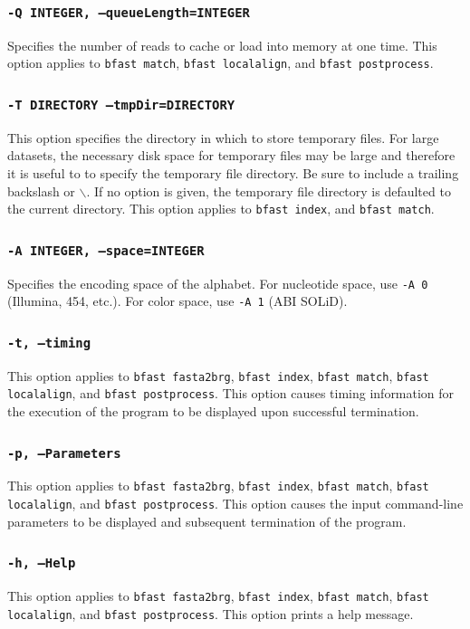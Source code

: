 \documentclass[a4paper,12pt]{book}
\newcommand{\TT}[1]{{\tt #1}} %
\begin{document}
\subsubsection{\TT{-Q INTEGER, --queueLength=INTEGER}}
Specifies the number of reads to cache or load into memory at one time.
This option applies to \TT{bfast match}, \TT{bfast localalign}, and \TT{bfast postprocess}.

\subsubsection{\TT{-T DIRECTORY --tmpDir=DIRECTORY}}
This option specifies the directory in which to store temporary files.
For large datasets, the necessary disk space for temporary files may be large and therefore it is useful to to specify the temporary file directory. 
Be sure to include a trailing backslash or $\backslash$.
If no option is given, the temporary file directory is defaulted to the current directory.
This option applies to \TT{bfast index}, and \TT{bfast match}.

\subsubsection{\TT{-A INTEGER, --space=INTEGER}}
Specifies the encoding space of the alphabet.
For nucleotide space, use \TT{-A 0} (Illumina, 454, etc.).
For color space, use \TT{-A 1} (ABI SOLiD).


\subsubsection{\TT{-t, --timing}}
This option applies to \TT{bfast fasta2brg}, \TT{bfast index}, \TT{bfast match}, \TT{bfast localalign}, and \TT{bfast postprocess}.
This option causes timing information for the execution of the program to be displayed upon successful termination.

\subsubsection{\TT{-p, --Parameters}}
This option applies to \TT{bfast fasta2brg}, \TT{bfast index}, \TT{bfast match}, \TT{bfast localalign}, and \TT{bfast postprocess}.
This option causes the input command-line parameters to be displayed and subsequent termination of the program.

\subsubsection{\TT{-h, --Help}}
This option applies to \TT{bfast fasta2brg}, \TT{bfast index}, \TT{bfast match}, \TT{bfast localalign}, and \TT{bfast postprocess}.
This option prints a help message.
\end{document}
